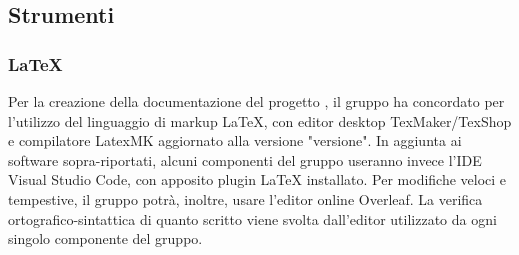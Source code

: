 \subsection{Strumenti}
\subsubsection{\LaTeX{}}
Per la creazione della documentazione del progetto {\NomeProgetto}, il gruppo {\Gruppo} ha concordato per l’utilizzo del linguaggio di markup \LaTeX{}, con editor desktop TexMaker/TexShop e compilatore LatexMK aggiornato alla versione "versione".
In aggiunta ai software sopra-riportati, alcuni componenti del gruppo useranno invece l'IDE Visual Studio Code, con apposito plugin \LaTeX{} installato.
Per modifiche veloci e tempestive, il gruppo potrà, inoltre, usare l'editor online Overleaf.
La verifica ortografico-sintattica di quanto scritto viene svolta dall’editor utilizzato da ogni singolo componente del gruppo.

